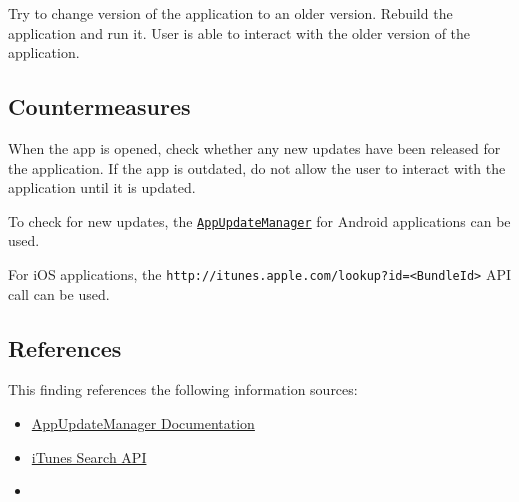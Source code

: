 Try to change version of the application to an older version.
Rebuild the application and run it.
User is able to interact with the older version of the application.

 



\subsection*{Countermeasures}

When the app is opened, check whether any new updates have been released for the application.
If the app is outdated, do not allow the user to interact with the application until it is updated.

To check for new updates, the \texttt{\href{https://developer.android.com/reference/com/google/android/play/core/appupdate/AppUpdateManager}{AppUpdateManager}} for Android applications can be used.

For iOS applications, the \texttt{http://itunes.apple.com/lookup?id=<BundleId>} API call can be used.

\pagebreak


\subsection*{References}

This finding references the following information sources:

\begin{itemize}
    \item \href{https://developer.android.com/reference/com/google/android/play/core/appupdate/AppUpdateManager}{AppUpdateManager Documentation}
    \item \href{https://performance-partners.apple.com/search-api}{iTunes Search API}
	\item {}
\end{itemize}




